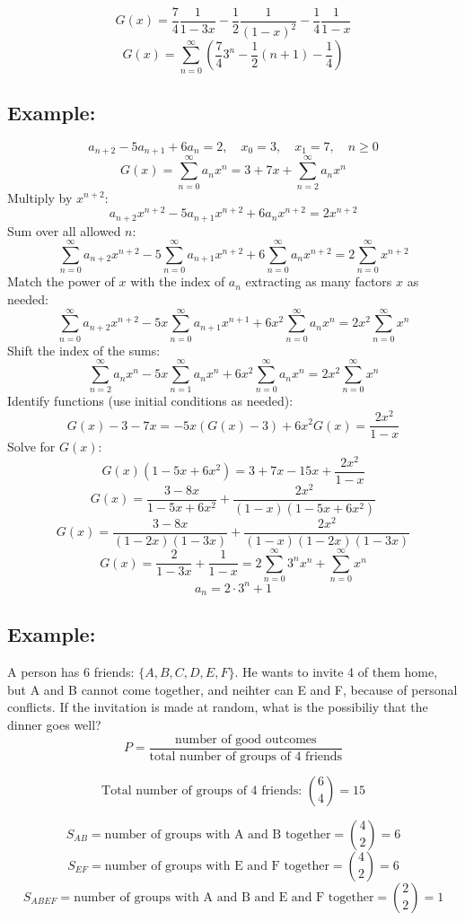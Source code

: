 \documentclass[11pt]{article}
\begin{document}
\[
G(x) = \frac{7}{4} \frac{1}{1 - 3x} - \frac{1}{2} \frac{1}{(1 - x)^2} - \frac{1}{4} \frac{1}{1 - x}
\]
\[
G(x) = \sum_{n = 0}^{\infty} \left( \frac{7}{4} 3^n - \frac{1}{2} (n + 1) - \frac{1}{4} \right) 
\]

\subsection*{Example:}
\[
a_{n+2} - 5a_{n+1} + 6a_n = 2, \quad x_0 = 3, \quad x_1 = 7, \quad n \geq 0
\]
\[
G(x) = \sum_{n = 0}^{\infty} a_n x^n = 3 + 7x + \sum_{n = 2}^{\infty} a_n x^n
\]
Multiply by $x^{n+2}$:
\[
a_{n+2} x^{n+2} - 5a_{n+1} x^{n+2} + 6a_n x^{n+2} = 2x^{n+2}
\]
Sum over all allowed $n$:
\[
\sum_{n = 0}^{\infty} a_{n+2} x^{n+2} - 5 \sum_{n = 0}^{\infty} a_{n+1} x^{n+2} + 6 \sum_{n = 0}^{\infty} a_n x^{n+2} = 2 \sum_{n = 0}^{\infty} x^{n+2}
\]
Match the power of $x$ with the index of $a_n$ extracting as many factors $x$ as needed:
\[
\sum_{n = 0}^{\infty} a_{n+2} x^{n+2} - 5x \sum_{n = 0}^{\infty} a_{n+1} x^{n+1} + 6x^2 \sum_{n = 0}^{\infty} a_n x^n = 2x^2 \sum_{n = 0}^{\infty} x^n
\]
Shift the index of the sums:
\[
\sum_{n = 2}^{\infty} a_n x^n - 5x \sum_{n = 1}^{\infty} a_n x^n + 6x^2 \sum_{n = 0}^{\infty} a_n x^n = 2x^2 \sum_{n = 0}^{\infty} x^n
\]
Identify functions (use initial conditions as needed):
\[
G(x) - 3 - 7x = -5x(G(x) - 3) + 6x^2 G(x) = \frac{2x^2}{1 - x}
\]
Solve for $G(x)$:
\[
G(x) (1 - 5x + 6x^2) = 3 + 7x - 15x + \frac{2x^2}{1 - x} 
\]
\[
G(x) = \frac{3 - 8x}{1 - 5x + 6x^2} + \frac{2x^2}{(1 - x)(1 - 5x + 6x^2)}
\]
\[
G(x) = \frac{3 - 8x}{(1 - 2x)(1 - 3x)} + \frac{2x^2}{(1 - x)(1 - 2x)(1 - 3x)}
\]
\[
G(x) = \frac{2}{1 - 3x} + \frac{1}{1 - x} = 2 \sum_{n = 0}^{\infty} 3^n x^n + \sum_{n = 0}^{\infty} x^n
\]
\[
a_n = 2 \cdot 3^n + 1
\]

\subsection*{Example:}
A person has 6 friends: $\{A, B, C, D, E, F\}$. He wants to invite 4 of them home, but A and B cannot come together, and neihter can E and F, because of personal conflicts. If the invitation is made at random, what is the possibiliy that the dinner goes well?
\[
P = \frac{\text{number of good outcomes}}{\text{total number of groups of 4 friends}}
\]

\[
\text{Total number of groups of 4 friends: } \binom{6}{4} = 15
\]

\[
S_{AB} = \text{number of groups with A and B together} = \binom{4}{2} = 6
\]
\[
S_{EF} = \text{number of groups with E and F together} = \binom{4}{2} = 6
\]
\[
S_{ABEF} = \text{number of groups with A and B and E and F together} = \binom{2}{2} = 1
\]
\end{document}
